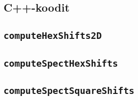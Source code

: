\begin{appendices}
\begin{landscape}
        \section{C++-koodit}\label{appendix:code}
        \subsection{\texttt{computeHexShifts2D}}\label{appendix:2Dsiirto}
        \subsection{\texttt{computeSpectHexShifts}}\label{appendix:3Dsiirto}
        \subsection{\texttt{computeSpectSquareShifts}}\label{appendix:malli3}
    \end{landscape}
\end{appendices}